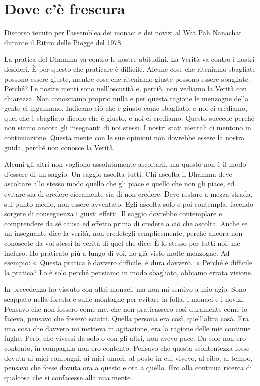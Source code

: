 \chapter{Dove c'è frescura}

\begin{openingQuote}
  Discorso tenuto per l'assemblea dei monaci e dei novizi al Wat Pah Nanachat
  durante il Ritiro delle Piogge del 1978.
\end{openingQuote}

La pratica del Dhamma va contro le nostre abitudini. La Verità va contro
i nostri desideri. È per questo che praticare è difficile. Alcune cose
che riteniamo sbagliate possono essere giuste, mentre cose che riteniamo
giuste possono essere sbagliate. Perché? Le nostre menti sono
nell'oscurità e, perciò, non vediamo la Verità con chiarezza. Non
conosciamo proprio nulla e per questa ragione le menzogne della gente ci
ingannano. Indicano ciò che è giusto come sbagliato, e noi ci crediamo,
quel che è sbagliato dicono che è giusto, e noi ci crediamo. Questo
succede perché non siamo ancora gli insegnanti di noi stessi. I nostri
stati mentali ci mentono in continuazione. Questa mente con le sue
opinioni non dovrebbe essere la nostra guida, perché non conosce la
Verità.

Alcuni gli altri non vogliono assolutamente ascoltarli, ma questo non è
il modo d'essere di un saggio. Un saggio ascolta tutti. Chi ascolta il
Dhamma deve ascoltare allo stesso modo quello che gli piace e quello che
non gli piace, ed evitare sia di credere ciecamente sia di non credere.
Deve restare a mezza strada, sul punto medio, non essere avventato. Egli
ascolta solo e poi contempla, facendo sorgere di conseguenza i giusti
effetti. Il saggio dovrebbe contemplare e comprendere da sé causa ed
effetto prima di credere a ciò che ascolta. Anche se un insegnante dice
la verità, non credetegli semplicemente, perché ancora non conoscete da
voi stessi la verità di quel che dice. È lo stesso per tutti noi, me
incluso. Ho praticato più a lungo di voi, ho già visto molte menzogne.
Ad esempio: «~Questa pratica è davvero difficile, è dura davvero.~»
Perché è difficile la pratica? Lo è solo perché pensiamo in modo
sbagliato, abbiamo errata visione.

In precedenza ho vissuto con altri monaci, ma non mi sentivo a mio agio.
Sono scappato nella foresta e sulle montagne per evitare la folla, i
monaci e i novizi. Pensavo che non fossero come me, che non praticassero
così duramente come io facevo, pensavo che fossero sciatti. Quella
persona era così, quell'altra cosà. Era una cosa che davvero mi metteva
in agitazione, era la ragione delle mie continue fughe. Però, che
vivessi da solo o con gli altri, non avevo pace. Da solo non ero
contento, in compagnia non ero contento. Pensavo che questa scontentezza
fosse dovuta ai miei compagni, ai miei umori, al posto in cui vivevo, al
cibo, al tempo, pensavo che fosse dovuta ora a questo e ora a quello.
Ero alla continua ricerca di qualcosa che si confacesse alla mia mente.

